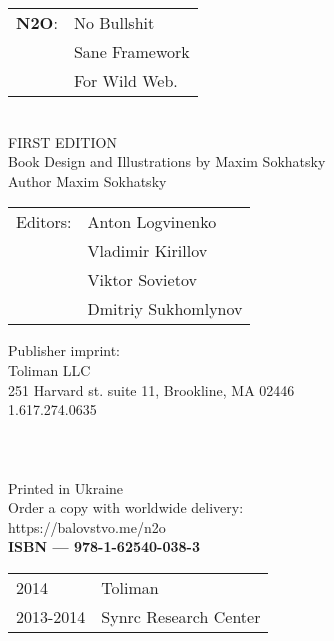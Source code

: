 \begingroup
\topskip 20pt
\parindent 0pt
\parskip
\baselineskip

\begin{tabular}{ll}
{\bf N2O}: & No Bullshit \\
    & Sane Framework \\
    & For Wild Web. \\
\end{tabular}
\\

FIRST EDITION \\

Book Design and Illustrations by Maxim Sokhatsky \\
Author Maxim Sokhatsky \\

\begin{tabular}{ll}
Editors: & Anton Logvinenko \\
         & Vladimir Kirillov \\
         & Viktor Sovietov \\
         & Dmitriy Sukhomlynov \\
\end{tabular}

Publisher imprint: \\
Toliman LLC \\
251 Harvard st. suite 11, Brookline, MA 02446 \\
1.617.274.0635 \\
\\
\\
\\




Printed in Ukraine \\

Order a copy with worldwide delivery: \\
https://balovstvo.me/n2o \\

{\bf  ISBN — 978-1-62540-038-3\hspace{2em}}

\begin{tabular}{ll}
\textcopyright{} 2014 & Toliman \\
\textcopyright{} 2013-2014 & Synrc Research Center
\end{tabular}

\endgroup

   \thispagestyle{empty}
